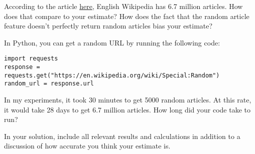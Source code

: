 \documentclass{article}
\begin{document}
According to the article \href{https://en.wikipedia.org/wiki/English_Wikipedia}{here}, English Wikipedia has 6.7 million articles. How does that compare to your estimate? How does the fact that the random article feature doesn't perfectly return random articles bias your estimate?

In Python, you can get a random URL by running the following code:

\begin{verbatim}
import requests
response = requests.get("https://en.wikipedia.org/wiki/Special:Random")
random_url = response.url	
\end{verbatim}

In my experiments, it took 30 minutes to get 5000 random articles. At this rate, it would take 28 days to get 6.7 million articles.
How long did your code take to run?

In your solution, include all relevant results and calculations in addition to a discussion of how accurate you think your estimate is.

%
\end{document}
